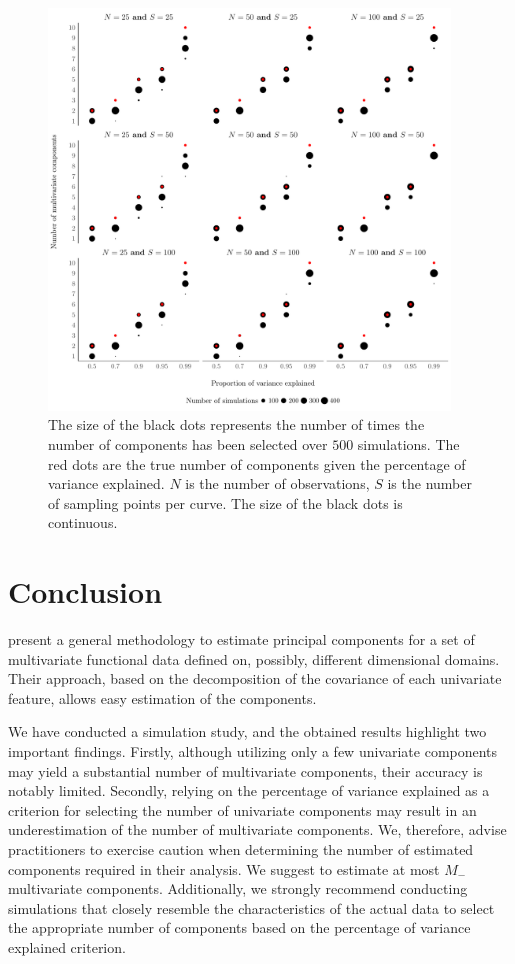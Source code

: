 \begin{figure}
     \centering
    \includegraphics[width=0.95\textwidth]{figures/npc_estim.pdf}
    \caption{The size of the black dots represents the number of times the number of components has been selected over $500$ simulations. The red dots are the true number of components given the percentage of variance explained. $N$ is the number of observations, $S$ is the number of sampling points per curve. The size of the black dots is continuous.}
    \label{fig:npc_estim}
\end{figure}


\section{Conclusion} %
\label{sec:conclusion}

\cite{happMultivariateFunctionalPrincipal2018} present a general methodology to estimate principal components for a set of multivariate functional data defined on, possibly, different dimensional domains. Their approach, based on the decomposition of the covariance of each univariate feature, allows easy estimation of the components.

We have conducted a simulation study, and the obtained results highlight two important findings. Firstly, although utilizing only a few univariate components may yield a substantial number of multivariate components, their accuracy is notably limited. Secondly, relying on the percentage of variance explained as a criterion for selecting the number of univariate components may result in an underestimation of the number of multivariate components. We, therefore, advise practitioners to exercise caution when determining the number of estimated components required in their analysis. We suggest to estimate at most $M_{-}$ multivariate components. Additionally, we strongly recommend conducting simulations that closely resemble the characteristics of the actual data to select the appropriate number of components based on the percentage of variance explained criterion.






